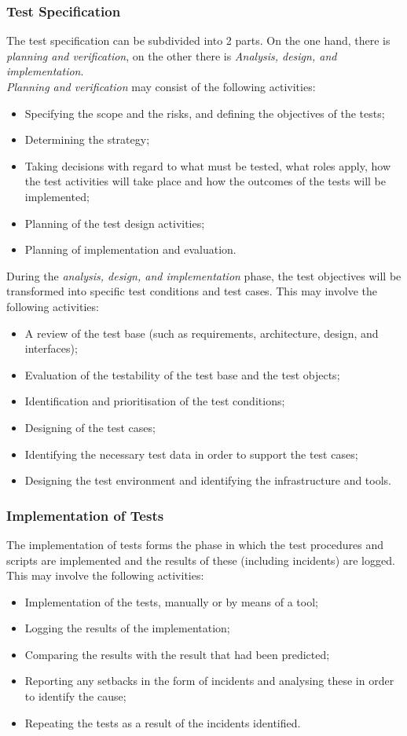 \documentclass[12pt]{article}
\begin{document}
\subsubsection{Test Specification}
The test specification can be subdivided into 2 parts. On the one hand, there is \textit{planning and verification}, on the other there is \textit{Analysis, design, and implementation}.\\
\indent \textit{Planning and verification} may consist of the following activities:
\begin{itemize}
 \item Specifying the scope and the risks, and defining the objectives of the tests;
\item Determining the strategy;
\item Taking decisions with regard to what must be tested, what roles apply, how the test activities will take place and how the outcomes of the tests will be implemented;
\item Planning of the test design activities;
\item Planning of implementation and evaluation.
\end{itemize}
During the \textit{analysis, design, and implementation} phase, the test objectives will be transformed into specific test conditions and test cases. This may involve the following activities:
\begin{itemize}
 \item A review of the test base (such as requirements, architecture, design, and interfaces);
\item Evaluation of the testability of the test base and the test objects;
\item Identification and prioritisation of the test conditions;
\item Designing of the test cases;
\item Identifying the necessary test data in order to support the test cases;
\item Designing the test environment and identifying the infrastructure and tools.
\end{itemize}
\subsubsection{Implementation of Tests}
The implementation of tests forms the phase in which the test procedures and scripts are implemented and the results of these (including incidents) are logged. This may involve the following activities:
\begin{itemize}
 \item Implementation of the tests, manually or by means of a tool;
\item Logging the results of the implementation;
\item Comparing the results with the result that had been predicted;
\item Reporting any setbacks in the form of incidents and analysing these in order to identify the cause;
\item Repeating the tests as a result of the incidents identified.
\end{itemize}
\end{document}
